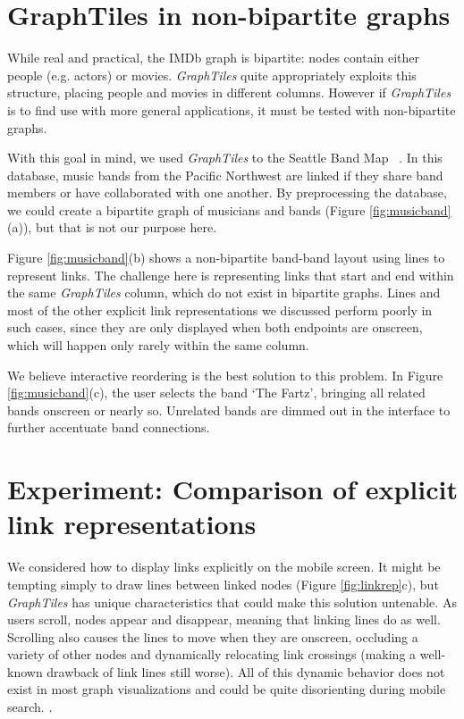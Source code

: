 \documentclass{sigchi}
\begin{document}
\section{GraphTiles in non-bipartite graphs}

While real and practical, the IMDb graph is bipartite: nodes contain either people (e.g. actors) or movies. \textit{GraphTiles} quite appropriately exploits this structure, placing people and movies in different columns. However if \textit{GraphTiles} is to find use with more general applications, it must be tested with non-bipartite graphs. 

With this goal in mind, we used \textit{GraphTiles} to the Seattle Band Map ~\cite{seattleband}. In this database, music bands from the Pacific Northwest are linked if they share band members or have collaborated with one another. By preprocessing the database, we could create a bipartite graph of musicians and bands (Figure \ref{fig:musicband}(a)), but that is not our purpose here. 

Figure \ref{fig:musicband}(b) shows a non-bipartite band-band layout using lines to represent links. The challenge here is representing links that start and end within the same \textit{GraphTiles} column, which do not exist in bipartite graphs. Lines and most of the other explicit link representations we discussed perform poorly in such cases, since they are only displayed when both endpoints are onscreen, which will happen only rarely within the same column.

We believe interactive reordering is the best solution to this problem. In Figure \ref{fig:musicband}(c), the user selects the band `The Fartz', bringing all related bands onscreen or nearly so. Unrelated bands are dimmed out in the interface to further accentuate band connections.


\section{Experiment: Comparison of explicit link representations}


We considered how to display links explicitly on the mobile screen. It might be tempting simply to draw lines between linked nodes (Figure \ref{fig:linkrep}c), but \textit{GraphTiles} has unique characteristics that could make this solution untenable. As users scroll, nodes appear and disappear, meaning that linking lines do as well. Scrolling also causes the lines to move when they are onscreen, occluding a variety of other nodes and dynamically relocating link crossings (making a well-known drawback of link lines still worse). All of this dynamic behavior does not exist in most graph visualizations and could be quite disorienting during mobile search. .
\end{document}
